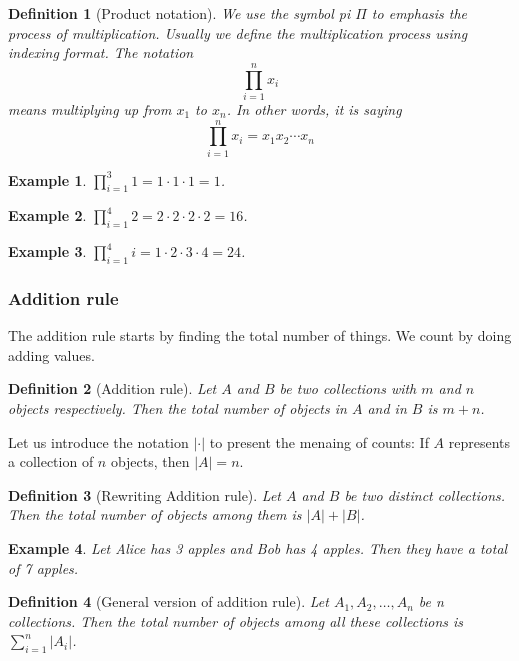 \documentclass[12pt]{article}
\newtheorem{definition}{Definition}[section]
\newtheorem*{example}{Example}
\begin{document}
    \begin{definition}[Product notation]
        We use the symbol pi $\Pi$ to emphasis the process of multiplication. Usually we define the multiplication process using indexing format. The notation $$\prod_{i=1}^{n}x_i$$ means multiplying up from $x_1$ to $x_n$. In other words, it is saying $$\prod_{i=1}^{n}x_i = x_1 x_2 \cdots x_n$$
    \end{definition}

    \begin{example}
        $\displaystyle\prod_{i=1}^{3}1 = 1\cdot 1\cdot 1 = 1$. 
    \end{example}
    
    \begin{example}
        $\displaystyle\prod_{i=1}^{4}2 = 2\cdot 2\cdot 2\cdot 2 = 16$. 
    \end{example}

    \begin{example}
        $\displaystyle\prod_{i=1}^{4}i=1\cdot 2\cdot 3\cdot 4=24$.
    \end{example}

    \subsubsection*{Addition rule}

    The addition rule starts by finding the total number of things. We count by doing adding values.

    \begin{definition}[Addition rule]
        Let $A$ and $B$ be two collections with $m$ and $n$ objects respectively. Then the total number of objects in $A$ and in $B$ is $m+n$.
    \end{definition}

    Let us introduce the notation $|\cdot|$ to present the menaing of counts: If $A$ represents a collection of $n$ objects, then $|A|=n$.

    \begin{definition}[Rewriting Addition rule]
        Let $A$ and $B$ be two distinct collections. Then the total number of objects among them is $|A|+|B|$.
    \end{definition}

    \begin{example}
        Let Alice has 3 apples and Bob has 4 apples. Then they have a total of 7 apples.
    \end{example}

    \begin{definition}[General version of addition rule]
        Let $A_1,A_2,\dots,A_n$ be n collections. Then the total number of objects among all these collections is $\displaystyle \sum_{i=1}^{n}|A_i|$. 
    \end{definition}
\end{document}
